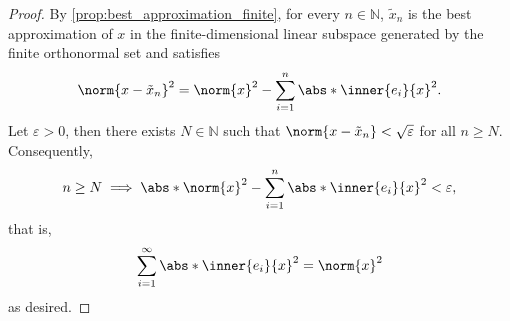 \begin{proof}
    By \cref{prop:best_approximation_finite}, for every \(n \in \mathbb{N}\), \(\tilde{x}_n\) is the best approximation of \(x\) in the finite-dimensional linear subspace generated by the finite orthonormal set  and satisfies
    \begin{equation*}
        \norm{x - \tilde{x}_n}^2 = \norm{x}^2 - \sum_{i=1}^n \abs*{\inner{e_i}{x}}^2.
    \end{equation*}
    Let \(\varepsilon > 0\), then there exists \(N \in \mathbb{N}\) such that \(\norm{x - \tilde{x}_n} < \sqrt{\varepsilon}\) for all \(n \geq N\). Consequently,
    \begin{equation*}
        n \geq N \implies \abs*{\norm{x}^2 - \sum_{i=1}^n \abs*{\inner{e_i}{x}}^2} < \varepsilon,
    \end{equation*}
    that is,
    \begin{equation*}
        \sum_{i=1}^\infty \abs*{\inner{e_i}{x}}^2 = \norm{x}^2
    \end{equation*}
    as desired.
\end{proof}


